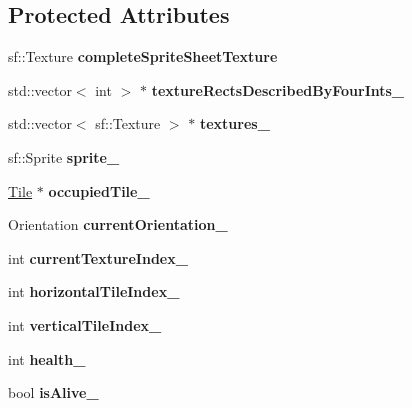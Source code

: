 \subsection*{Protected Attributes}
\begin{DoxyCompactItemize}
\item 
\mbox{\label{classRose_1_1Character_1_1Actor_a154034e57c94a0f5d2197856d953ffc0}} 
sf\+::\+Texture {\bfseries complete\+Sprite\+Sheet\+Texture}
\item 
\mbox{\label{classRose_1_1Character_1_1Actor_a8e1a1853df655bd7388add1854de4707}} 
std\+::vector$<$ int $>$ $\ast$ {\bfseries texture\+Rects\+Described\+By\+Four\+Ints\+\_\+}
\item 
\mbox{\label{classRose_1_1Character_1_1Actor_a6f1fcade89f64ebaa1ea166a08bb4075}} 
std\+::vector$<$ sf\+::\+Texture $>$ $\ast$ {\bfseries textures\+\_\+}
\item 
\mbox{\label{classRose_1_1Character_1_1Actor_aedd0c9af625084a3771a2a2394021459}} 
sf\+::\+Sprite {\bfseries sprite\+\_\+}
\item 
\mbox{\label{classRose_1_1Character_1_1Actor_a92c2502aec26ccebe66f5f9ff0cf2a10}} 
\mbox{\hyperlink{classRose_1_1Tile}{Tile}} $\ast$ {\bfseries occupied\+Tile\+\_\+}
\item 
\mbox{\label{classRose_1_1Character_1_1Actor_a91422a56f499bd4ac04c627168af01cb}} 
Orientation {\bfseries current\+Orientation\+\_\+}
\item 
\mbox{\label{classRose_1_1Character_1_1Actor_a173fe8cc847412dd45e89210f41c5817}} 
int {\bfseries current\+Texture\+Index\+\_\+}
\item 
\mbox{\label{classRose_1_1Character_1_1Actor_aca14231d396a2919b6c20db6fcfff458}} 
int {\bfseries horizontal\+Tile\+Index\+\_\+}
\item 
\mbox{\label{classRose_1_1Character_1_1Actor_add9be456b9b8d1652ae80c000f774134}} 
int {\bfseries vertical\+Tile\+Index\+\_\+}
\item 
\mbox{\label{classRose_1_1Character_1_1Actor_a1a57a4b6ef63cc736a1e136e33a6d060}} 
int {\bfseries health\+\_\+}
\item 
\mbox{\label{classRose_1_1Character_1_1Actor_ac2ea7e7b4a1dae31e7f4aae3a2f1192f}} 
bool {\bfseries is\+Alive\+\_\+}
\end{DoxyCompactItemize}


